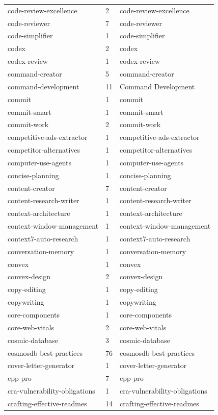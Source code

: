 \begin{longtable}{@{}lll@{}}
code-review-excellence & 2 & code-review-excellence\\
code-reviewer & 7 & code-reviewer\\
code-simplifier & 1 & code-simplifier\\
codex & 2 & codex\\
codex-review & 1 & codex-review\\
command-creator & 5 & command-creator\\
command-development & 11 & Command Development\\
commit & 1 & commit\\
commit-smart & 1 & commit-smart\\
commit-work & 2 & commit-work\\
competitive-ads-extractor & 1 & competitive-ads-extractor\\
competitor-alternatives & 1 & competitor-alternatives\\
computer-use-agents & 1 & computer-use-agents\\
concise-planning & 1 & concise-planning\\
content-creator & 7 & content-creator\\
content-research-writer & 1 & content-research-writer\\
context-architecture & 1 & context-architecture\\
context-window-management & 1 & context-window-management\\
context7-auto-research & 1 & context7-auto-research\\
conversation-memory & 1 & conversation-memory\\
convex & 1 & convex\\
convex-design & 2 & convex-design\\
copy-editing & 1 & copy-editing\\
copywriting & 1 & copywriting\\
core-components & 1 & core-components\\
core-web-vitals & 2 & core-web-vitals\\
cosmic-database & 3 & cosmic-database\\
cosmosdb-best-practices & 76 & cosmosdb-best-practices\\
cover-letter-generator & 1 & cover-letter-generator\\
cpp-pro & 7 & cpp-pro\\
cra-vulnerability-obligations & 1 & cra-vulnerability-obligations\\
crafting-effective-readmes & 14 & crafting-effective-readmes\\

\end{longtable}
